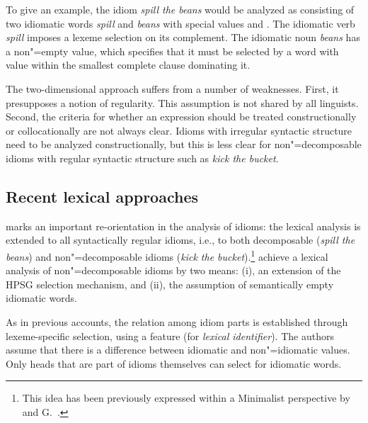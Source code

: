 \documentclass[output=paper,biblatex,babelshorthands,newtxmath,draftmode,colorlinks,citecolor=brown]{langscibook}
\begin{document}
To give an example, the idiom \emph{spill the beans} would be analyzed as consisting of two
idiomatic words \emph{spill} and \emph{beans} with special  values  and
\mbox{}. The idiomatic verb \emph{spill} imposes a lexeme selection on its
complement. The idiomatic noun \emph{beans} has a non"=empty  value, which specifies that
it must be selected by a word with  value  within the smallest complete
clause dominating it.


The two-dimensional approach suffers from a number of weaknesses.  First, it presupposes a notion of
regularity. This assumption is not shared by all linguists.  Second, the criteria for whether an
expression should be treated constructionally or collocationally are not always clear.  Idioms with
irregular syntactic structure need to be analyzed constructionally, but this is less clear for
non"=decomposable idioms with regular syntactic structure such as \emph{kick the bucket}.



\subsection{Recent lexical approaches}
\label{Sec-RecentLexical}\label{idioms:recent-lexical-approaches}

\largerpage
\enlargethispage{3pt}
\citet{KSF2015a} marks an important re-orientation in the analysis of idioms: the lexical analysis
is extended to all syntactically regular idioms, i.e., to both decomposable (\emph{spill the beans})
and non"=decomposable idioms (\emph{kick the bucket}).\footnote{This idea has been previously
  expressed within a Minimalist perspective by  and G.\ .  }
%
\citet{KSF2015a} achieve a lexical analysis of non"=decomposable idioms by two means: (i), an
extension of the HPSG selection mechanism, and (ii), the assumption of semantically empty idiomatic
words.  

As in previous accounts, the relation among idiom parts is established through lexeme-specific
selection, using a feature  (for \emph{lexical identifier}).  The authors assume that
there is a difference between idiomatic and non"=idiomatic  values.  Only heads that are
part of idioms themselves can select for idiomatic words.
\end{document}

